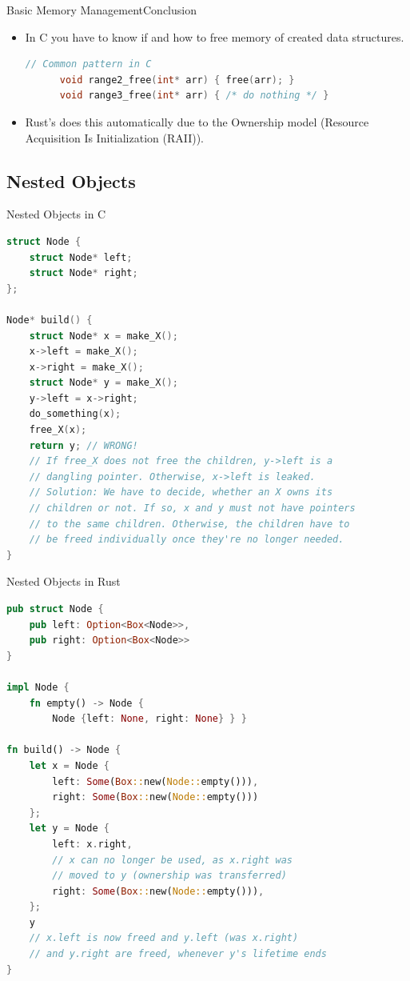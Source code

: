 \begin{Frame}[fragile]{Basic Memory Management}{Conclusion}
  \begin{itemize}
    \item In C you have to know if and how to free memory of created data structures.
    \begin{lstlisting}[language=C,gobble=6]
      // Common pattern in C
      void range2_free(int* arr) { free(arr); }
      void range3_free(int* arr) { /* do nothing */ }
    \end{lstlisting}
    \item Rust's does this automatically due to the Ownership model (Resource Acquisition
    Is Initialization (RAII)).
  \end{itemize}
\end{Frame}

\subsection{Nested Objects}

\begin{Frame}[fragile]{Nested Objects in C}
\begin{lstlisting}[language=C]
struct Node {
    struct Node* left;
    struct Node* right;
};

Node* build() {
    struct Node* x = make_X();
    x->left = make_X();
    x->right = make_X();
    struct Node* y = make_X();
    y->left = x->right;
    do_something(x);
    free_X(x);
    return y; // WRONG!
    // If free_X does not free the children, y->left is a
    // dangling pointer. Otherwise, x->left is leaked.
    // Solution: We have to decide, whether an X owns its
    // children or not. If so, x and y must not have pointers
    // to the same children. Otherwise, the children have to
    // be freed individually once they're no longer needed.
}
\end{lstlisting}
\end{Frame}

\begin{Frame}[fragile]{Nested Objects in Rust}
\begin{lstlisting}[language=Rust]
pub struct Node {
    pub left: Option<Box<Node>>,
    pub right: Option<Box<Node>>
}

impl Node {
    fn empty() -> Node {
        Node {left: None, right: None} } }

fn build() -> Node {
    let x = Node {
        left: Some(Box::new(Node::empty())),
        right: Some(Box::new(Node::empty()))
    };
    let y = Node {
        left: x.right,
        // x can no longer be used, as x.right was
        // moved to y (ownership was transferred)
        right: Some(Box::new(Node::empty())),
    };
    y
    // x.left is now freed and y.left (was x.right)
    // and y.right are freed, whenever y's lifetime ends
}
\end{lstlisting}
\end{Frame}

